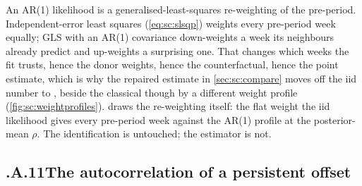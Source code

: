 An AR(1) likelihood is a generalised-least-squares re-weighting of the pre-period. Independent-error
least squares (\cref{eq:sc:slsqp}) weights every pre-period week equally; GLS with an AR(1)
covariance down-weights a week its neighbours already predict and up-weights a surprising one. That
changes which weeks the fit trusts, hence the donor weights, hence the counterfactual, hence the
point estimate, which is why the repaired estimate in \cref{sec:sc:compare} moves off the iid
number \keur{\nbSevenIidTotal} to \keur{\nbSevenBayesTotal}, beside the classical
\keur{\nbSevenClTotal} though by a different weight profile (\cref{fig:sc:weightprofiles}).
 draws the re-weighting itself: the flat weight the iid likelihood gives
every pre-period week against the AR(1) profile at the posterior-mean $\rho$. The
identification is untouched; the estimator is not.


\subsection*{\thechapter.A.11\quad The autocorrelation of a persistent offset}
\label{app:sc:acf}

